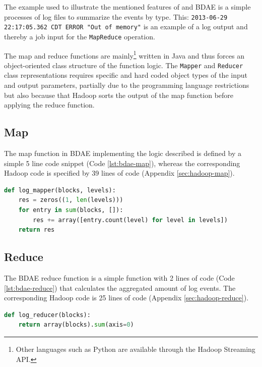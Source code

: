 The example used to illustrate the mentioned features of \CodeName and BDAE is a simple processes of log files to summarize the events by type\cite{PageTomWheeler}. This: \texttt{2013-06-29 22:17:05.362 CDT ERROR "Out of memory"} is an example of a log output and thereby a job input for the \texttt{MapReduce} operation. 
\newline

The map and reduce functions are mainly\footnote{Other languages such as Python are available through the Hadoop Streaming API.} written in Java and thus forces an object-oriented class structure of the function logic. The \texttt{Mapper} and \texttt{Reducer} class representations requires specific and hard coded object types of the input and output parameters, partially due to the programming language restrictions but also because that Hadoop sorts the output of the map function before applying the reduce function.

\subsection{Map}
The map function in BDAE implementing the logic described is defined by a simple 5 line code snippet (Code \ref{lst:bdae-map}), whereas the corresponding Hadoop code is specified by 39 lines of code (Appendix \ref{sec:hadoop-map}).

\begin{lstlisting}[float, basicstyle=\fontsize{8}{5}\selectfont\ttfamily, language=Python, xleftmargin=.8cm, caption={BDAE map function}, label={lst:bdae-map}]
def log_mapper(blocks, levels):
    res = zeros((1, len(levels)))
    for entry in sum(blocks, []):
        res += array([entry.count(level) for level in levels])
    return res
\end{lstlisting}

\subsection{Reduce}
The BDAE reduce function is a simple function with 2 lines of code (Code \ref{lst:bdae-reduce}) that calculates the aggregated amount of log events. The corresponding Hadoop code is 25 lines of code (Appendix \ref{sec:hadoop-reduce}).
\vspace*{4mm}

\begin{lstlisting}[basicstyle=\fontsize{8}{5}\selectfont\ttfamily, language=Python, xleftmargin=0.8cm, caption={BDAE reduce function}, label={lst:bdae-reduce}]
def log_reducer(blocks):
    return array(blocks).sum(axis=0)
\end{lstlisting}